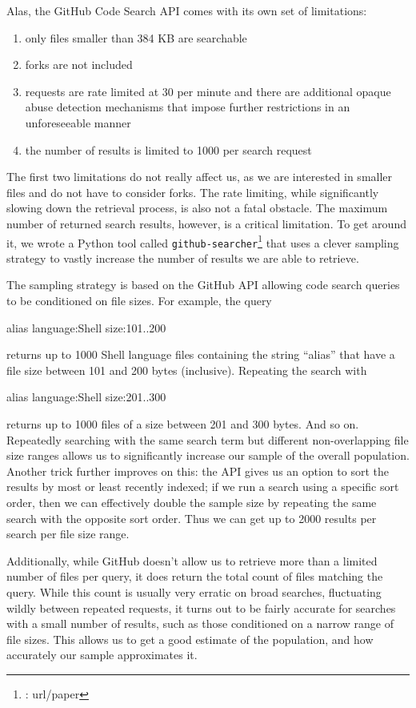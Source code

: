 Alas, the GitHub Code Search API comes with its own set of limitations:
\begin{enumerate}
    \item only files smaller than 384 KB are searchable
    \item forks are not included
    \item requests are rate limited at 30 per minute and there are additional opaque abuse detection mechanisms that impose further restrictions in an unforeseeable manner
    \item the number of results is limited to 1000 per search request
\end{enumerate}
The first two limitations do not really affect us, as we are interested in smaller files and do not have to consider forks.
The rate limiting, while significantly slowing down the retrieval process, is also not a fatal obstacle.
The maximum number of returned search results, however, is a critical limitation.
To get around it, we wrote a Python tool called \verb|github-searcher|\footnote{\TODO: url/paper} that uses a clever sampling strategy to vastly increase the number of results we are able to retrieve.

The sampling strategy is based on the GitHub API allowing code search queries to be conditioned on file sizes. 
For example, the query 
\begin{CVerbatim}
alias language:Shell size:101..200
\end{CVerbatim}
returns up to 1000 Shell language files containing the string ``alias'' that have a file size between 101 and 200 bytes (inclusive).
Repeating the search with 
\begin{CVerbatim}
alias language:Shell size:201..300
\end{CVerbatim}
returns up to 1000 files of a size between 201 and 300 bytes.
And so on.
Repeatedly searching with the same search term but different non-overlapping file size ranges allows us to significantly increase our sample of the overall population.
Another trick further improves on this: 
the API gives us an option to sort the results by most or least recently indexed;
if we run a search using a specific sort order, then we can effectively double the sample size by repeating the same search with the opposite sort order.
Thus we can get up to 2000 results per search per file size range.

Additionally, while GitHub doesn't allow us to retrieve more than a limited number of files per query, it does return the total count of files matching the query.
While this count is usually very erratic on broad searches, fluctuating wildly between repeated requests, it turns out to be fairly accurate for searches with a small number of results, such as those conditioned on a narrow range of file sizes.
This allows us to get a good estimate of the population, and how accurately our sample approximates it.

